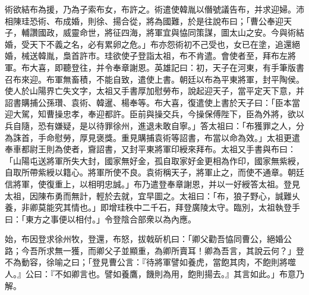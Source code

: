 \begin{pinyinscope}
術欲結布為援，乃為子索布女，布許之。術遣使韓胤以僭號議告布，并求迎婦。沛相陳珪恐術、布成婚，則徐、揚合從，將為國難，於是往說布曰；「曹公奉迎天子，輔讚國政，威靈命世，將征四海，將軍宜與恊同策謀，圖太山之安。今與術結婚，受天下不義之名，必有累卵之危。」布亦怨術初不己受也，女已在塗，追還絕婚，械送韓胤，梟首許市。珪欲使子登詣太祖，布不肯遣。會使者至，拜布左將軍。布大喜，即聽登往，并令奉章謝恩。英雄記曰：初，天子在河東，有手筆版書召布來迎。布軍無畜積，不能自致，遣使上書。朝廷以布為平東將軍，封平陶侯。使人於山陽界亡失文字，太祖又手書厚加慰勞布，說起迎天子，當平定天下意，并詔書購捕公孫瓚、袁術、韓暹、楊奉等。布大喜，復遣使上書於天子曰：「臣本當迎大駕，知曹操忠孝，奉迎都許。臣前與操交兵，今操保傅陛下，臣為外將，欲以兵自隨，恐有嫌疑，是以待罪徐州，進退未敢自寧。」答太祖曰：「布獲罪之人，分為誅首，手命慰勞，厚見褒獎。重見購捕袁術等詔書，布當以命為效。」太祖更遣奉車都尉王則為使者，齎詔書，又封平東將軍印綬來拜布。太祖又手書與布曰：「山陽屯送將軍所失大封，國家無好金，孤自取家好金更相為作印，國家無紫綬，自取所帶紫綬以籍心。將軍所使不良。袁術稱天子，將軍止之，而使不通章。朝廷信將軍，使復重上，以相明忠誠。」布乃遣登奉章謝恩，并以一好綬答太祖。登見太祖，因陳布勇而無計，輕於去就，宜早圖之。太祖曰：「布，狼子野心，誠難乆養，非卿莫能究其情也。」即增珪秩中二千石，拜登廣陵太守。臨別，太祖執登手曰：「東方之事便以相付。」令登陰合部衆以為內應。

始，布因登求徐州牧，登還，布怒，拔戟斫机曰：「卿父勸吾恊同曹公，絕婚公路；今吾所求無一獲，而卿父子並顯重，為卿所賣耳！卿為吾言，其說云何？」登不為動容，徐喻之曰；「登見曹公言：『待將軍譬如養虎，當飽其肉，不飽則將噬人。』公曰：『不如卿言也。譬如養鷹，饑則為用，飽則揚去。』其言如此。」布意乃解。


\end{pinyinscope}
